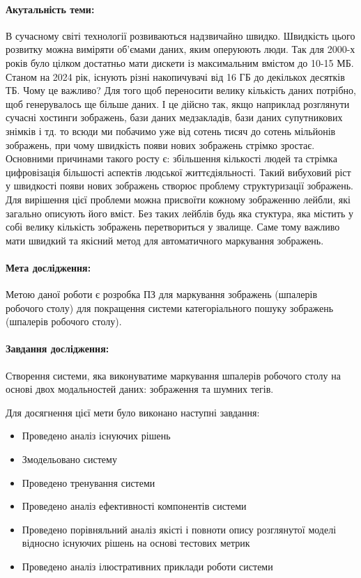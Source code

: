 \documentclass{udstu}
\begin{document}
\paragraph{\textbf{Акутальність теми:}}
В сучасному світі технології розвиваються надзвичайно швидко. Швидкість цього розвитку можна виміряти
об'ємами даних, яким оперуюють люди. Так для 2000-х років було цілком достатньо мати дискети із максимальним вмістом
до 10-15 МБ. Станом на 2024 рік, існують різні накопичувачі від 16 ГБ до декількох десятків ТБ. Чому це важливо?
Для того щоб переносити велику кількість даних потрібно, щоб генерувалось ще більше даних. І це дійсно так, якщо
наприклад розглянути сучасні хостинги зображень, бази даних медзакладів, бази даних супутникових знімків і тд.
то всюди ми побачимо уже від сотень тисяч до сотень мільйонів зображень,
при чому швидкість появи нових зображень стрімко зростає. Основними причинами такого росту є: збільшення кількості людей
та стрімка цифровізація більшості аспектів людської життєдіяльності. Такий вибуховий ріст у швидкості
появи нових зображень створює проблему структуризації зображень. Для вирішення цієї проблеми можна присвоїти
кожному зображенню лейбли, які загально описують його вміст.
Без таких лейблів будь яка стуктура, яка містить у собі велику кількість зображень перетвориться
у звалище. Саме тому важливо мати швидкий та якісний метод для автоматичного маркування зображень.

\paragraph{\textbf{Мета дослідження:}}
Метою даної роботи є розробка ПЗ для маркування зображень (шпалерів робочого столу)
для покращення системи категоріального пошуку зображень (шпалерів робочого столу).

\paragraph{\textbf{Завдання дослідження:}}
Створення системи, яка виконуватиме маркування шпалерів робочого столу на основі двох модальностей даних:
зображення та шумних тегів.

Для досягнення цієї мети було виконано наступні завдання:

\begin{itemize}
	\item Проведено аналіз існуючих рішень
	\item Змодельовано систему
	\item Проведено тренування системи
	\item Проведено аналіз ефективності компонентів системи
	\item Проведено порівняльний аналіз якісті і повноти опису розглянутої моделі
	відносно існуючих рішень на основі тестових метрик
	\item Проведено аналіз ілюстративних приклади роботи системи
\end{itemize}
\end{document}
